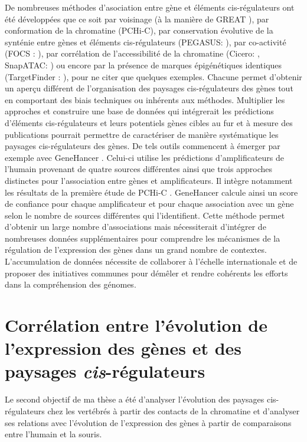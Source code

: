 De nombreuses méthodes d’asociation entre gène et éléments \gls{cis}-régulateurs ont été développées que ce soit par voisinage (à la manière de GREAT \citet{mclean_great_2010}), par conformation de la chromatine (\acrshort{PCHi-C}), par conservation évolutive de la synténie entre gènes et éléments \gls{cis}-régulateurs (PEGASUS: \citet{clement_enhancergene_2020}), par co-activité (FOCS : \citet{hait_focs_2018}), par corrélation de l’accessibilité de la chromatine (Cicero: \citet{pliner_cicero_2018}, SnapATAC: \citet{fang_comprehensive_2021}) ou encore par la présence de marques épigénétiques identiques (TargetFinder : \citet{whalen_enhancerpromoter_2016}), pour ne citer que quelques exemples. Chacune permet d’obtenir un aperçu différent de l’organisation des paysages \gls{cis}-régulateurs des gènes tout en comportant des biais techniques ou inhérents aux méthodes. Multiplier les approches et construire une base de données qui intégrerait les prédictions d’éléments \gls{cis}-régulateurs et leurs potentiels gènes cibles au fur et à mesure des publications pourrait permettre de caractériser de manière systématique les paysages \gls{cis}-régulateurs des gènes. De tels outils commencent à émerger par exemple avec GeneHancer \citep{fishilevich_genehancer_2017}. Celui-ci utilise les prédictions d’\glspl{amplificateur} de l’humain provenant de quatre sources différentes ainsi que trois approches distinctes pour l’association entre gènes et amplificateurs. Il intègre notamment les résultats de la première étude de \acrshort{PCHi-C} \citep{mifsud_mapping_2015}. GeneHancer calcule ainsi un score de confiance pour chaque \gls{amplificateur} et pour chaque association avec un gène selon le nombre de sources différentes qui l'identifient. Cette méthode permet d’obtenir un large nombre d’associations mais nécessiterait d’intégrer de nombreuses données supplémentaires pour comprendre les mécanismes de la régulation de l’expression des gènes dans un grand nombre de contextes. L’accumulation de données nécessite de collaborer à l’échelle internationale et de proposer des initiatives communes pour démêler et rendre cohérents les efforts dans la compréhension des génomes.

\section{Corrélation entre l’évolution de l’expression des gènes et des paysages \textit{cis}-régulateurs}

Le second objectif de ma thèse a été d'analyser l'évolution des paysages \gls{cis}-régulateurs chez les vertébrés à partir des contacts de la chromatine  et d'analyser ses relations avec l'évolution de l'expression des gènes à partir de comparaisons entre l'humain et la souris. 

